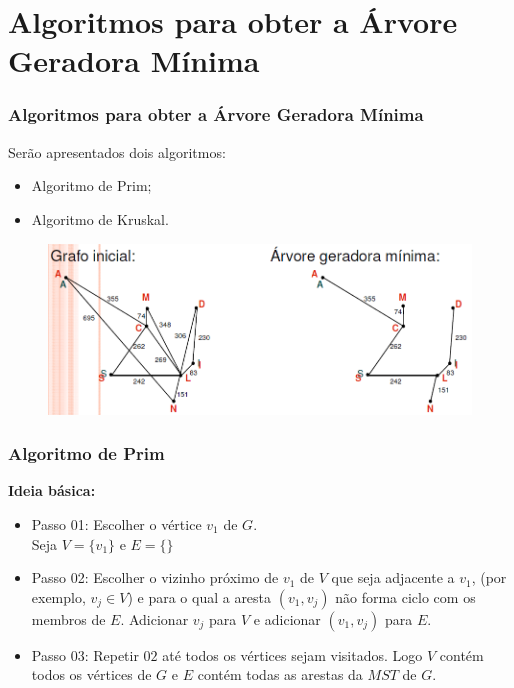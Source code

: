 \documentclass[hyperref={pdfpagelabels=false}]{beamer}
\begin{document}
\section{Algoritmos para obter a Árvore Geradora Mínima}

\begin{frame}
\frametitle{Algoritmos para obter a Árvore Geradora Mínima}

Serão apresentados dois algoritmos:
\begin{itemize}
	\item Algoritmo de Prim;
	\item Algoritmo de Kruskal.
\end{itemize}

	\begin{figure}[!h]
	\centering
	\includegraphics[scale=0.4]{11}
	\label{11}
	\end{figure}

\end{frame}

\begin{frame}
\frametitle{Algoritmo de Prim}

{\bf Ideia básica:}
\begin{itemize}
	\item Passo 01: Escolher o vértice $v_1$ de $G$.
	\\ Seja $V = \{v_1\}$ e $E = \{ \}$
	\item Passo 02: Escolher o vizinho próximo de $v_1$ de $V$ que seja adjacente a $v_1$, (por exemplo, $v_j \in V$) e para o qual a aresta $(v_1, v_j)$ não forma ciclo com os membros de $E$. Adicionar $v_j$ para $V$ e adicionar $(v_1, v_j)$ para $E$.
	\item Passo 03: Repetir $02$ até todos os vértices sejam visitados. Logo $V$ contém todos os vértices de $G$ e $E$ contém todas as arestas da $MST$ de $G$.
\end{itemize}

\end{frame}
\end{document}
